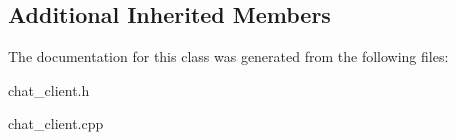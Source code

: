 \subsection*{Additional Inherited Members}


The documentation for this class was generated from the following files\+:\begin{DoxyCompactItemize}
\item 
chat\+\_\+client.\+h\item 
chat\+\_\+client.\+cpp\end{DoxyCompactItemize}
